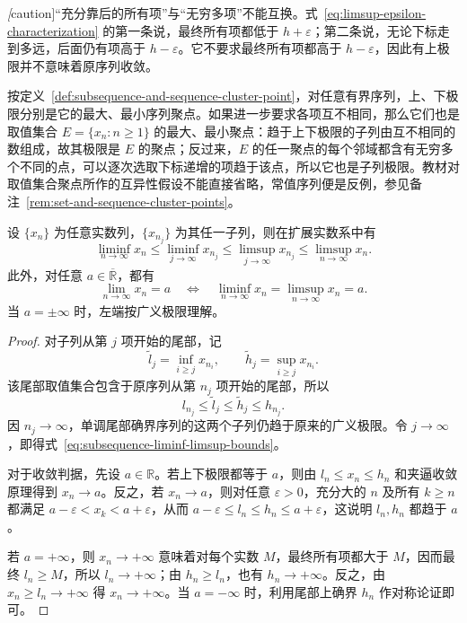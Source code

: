 \emph[caution]{“充分靠后的所有项”与“无穷多项”不能互换。}式~\eqref{eq:limsup-epsilon-characterization} 的第一条说，最终所有项都低于 $h+\varepsilon$；第二条说，无论下标走到多远，后面仍有项高于 $h-\varepsilon$。它不要求最终所有项都高于 $h-\varepsilon$，因此有上极限并不意味着原序列收敛。

\begin{remark}
\label{rem:liminf-limsup-and-set-cluster-points}
按定义~\ref{def:subsequence-and-sequence-cluster-point}，对任意有界序列，上、下极限分别是它的最大、最小序列聚点。如果进一步要求各项互不相同，那么它们也是取值集合 $E=\{x_n:n\geq1\}$ 的最大、最小聚点：趋于上下极限的子列由互不相同的数组成，故其极限是 $E$ 的聚点；反过来，$E$ 的任一聚点的每个邻域都含有无穷多个不同的点，可以逐次选取下标递增的项趋于该点，所以它也是子列极限。教材对取值集合聚点所作的互异性假设不能直接省略，常值序列便是反例，参见备注~\ref{rem:set-and-sequence-cluster-points}。
\end{remark}

\begin{theorem}[子列的上下极限与收敛判据]
\label{thm:subsequence-limits-and-convergence}
设 $\{x_n\}$ 为任意实数列，$\{x_{n_j}\}$ 为其任一子列，则在扩展实数系中有
\begin{equation}
    \liminf_{n\to\infty}x_n
    \leq\liminf_{j\to\infty}x_{n_j}
    \leq\limsup_{j\to\infty}x_{n_j}
    \leq\limsup_{n\to\infty}x_n.
    \label{eq:subsequence-liminf-limsup-bounds}
\end{equation}
此外，对任意 $a\in\overline{\mathbb{R}}$，都有
\begin{equation}
    \lim_{n\to\infty}x_n=a
    \quad\Longleftrightarrow\quad
    \liminf_{n\to\infty}x_n=\limsup_{n\to\infty}x_n=a.
    \label{eq:convergence-via-liminf-limsup}
\end{equation}
当 $a=\pm\infty$ 时，左端按广义极限理解。
\end{theorem}

\begin{proof}
对子列从第 $j$ 项开始的尾部，记
\[
    \widetilde l_j=\inf_{i\geq j}x_{n_i},
    \qquad \widetilde h_j=\sup_{i\geq j}x_{n_i}.
\]
该尾部取值集合包含于原序列从第 $n_j$ 项开始的尾部，所以
\[
    l_{n_j}\leq\widetilde l_j\leq\widetilde h_j\leq h_{n_j}.
\]
因 $n_j\to\infty$，单调尾部确界序列的这两个子列仍趋于原来的广义极限。令 $j\to\infty$，即得式~\eqref{eq:subsequence-liminf-limsup-bounds}。

对于收敛判据，先设 $a\in\mathbb{R}$。若上下极限都等于 $a$，则由 $l_n\leq x_n\leq h_n$ 和夹逼收敛原理得到 $x_n\to a$。反之，若 $x_n\to a$，则对任意 $\varepsilon>0$，充分大的 $n$ 及所有 $k\geq n$ 都满足 $a-\varepsilon<x_k<a+\varepsilon$，从而 $a-\varepsilon\leq l_n\leq h_n\leq a+\varepsilon$，这说明 $l_n,h_n$ 都趋于 $a$。

若 $a=+\infty$，则 $x_n\to+\infty$ 意味着对每个实数 $M$，最终所有项都大于 $M$，因而最终 $l_n\geq M$，所以 $l_n\to+\infty$；由 $h_n\geq l_n$，也有 $h_n\to+\infty$。反之，由 $x_n\geq l_n\to+\infty$ 得 $x_n\to+\infty$。当 $a=-\infty$ 时，利用尾部上确界 $h_n$ 作对称论证即可。
\end{proof}

